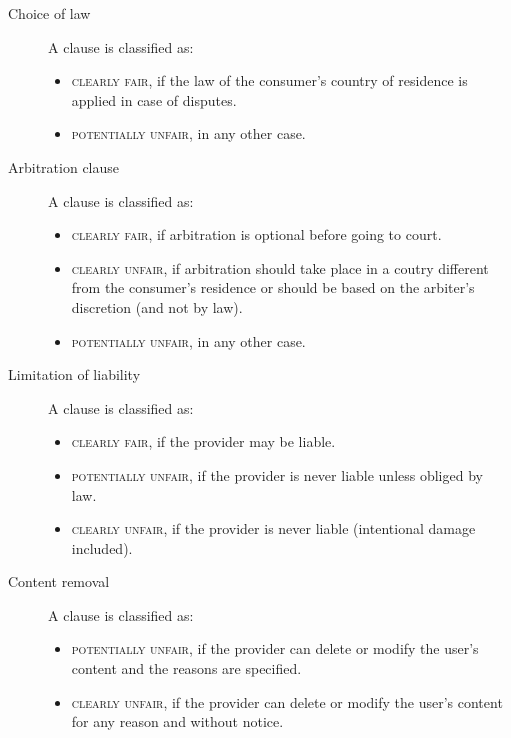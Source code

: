 \begin{description}
    \item[Choice of law] 
        A clause is classified as:
        \begin{itemize}
            \item \textsc{clearly fair}, if the law of the consumer's country of residence is applied in case of disputes. 
            \item \textsc{potentially unfair}, in any other case.
        \end{itemize}

    \item[Arbitration clause] 
        A clause is classified as:
        \begin{itemize}
            \item \textsc{clearly fair}, if arbitration is optional before going to court.
            \item \textsc{clearly unfair}, if arbitration should take place in a coutry different from the consumer's residence or should be based on the arbiter's discretion (and not by law).
            \item \textsc{potentially unfair}, in any other case.
        \end{itemize}

    \item[Limitation of liability] 
        A clause is classified as:
        \begin{itemize}
            \item \textsc{clearly fair}, if the provider may be liable.
            \item \textsc{potentially unfair}, if the provider is never liable unless obliged by law.
            \item \textsc{clearly unfair}, if the provider is never liable (intentional damage included).
        \end{itemize}

    \item[Content removal] 
        A clause is classified as:
        \begin{itemize}
            \item \textsc{potentially unfair}, if the provider can delete or modify the user's content and the reasons are specified.
            \item \textsc{clearly unfair}, if the provider can delete or modify the user's content for any reason and without notice.
        \end{itemize}
\end{description}



